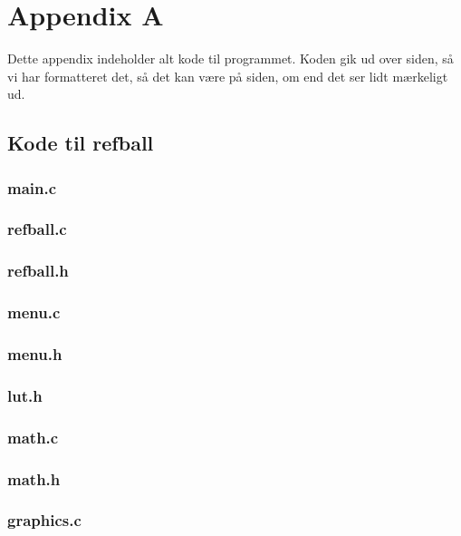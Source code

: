\section{Appendix A}
Dette appendix indeholder alt kode til programmet. Koden gik ud over siden, så vi har formatteret det, så det kan være på siden, om end det ser lidt mærkeligt ud.
\subsection{Kode til refball}
\subsubsection*{main.c}

\newpage
\subsubsection*{refball.c}

\newpage
\subsubsection*{refball.h}

\newpage
\subsubsection*{menu.c}

\newpage
\subsubsection*{menu.h}

\newpage
\subsubsection*{lut.h}

\newpage
\subsubsection*{math.c}

\newpage
\subsubsection*{math.h}

\newpage
\subsubsection*{graphics.c}

\newpage

